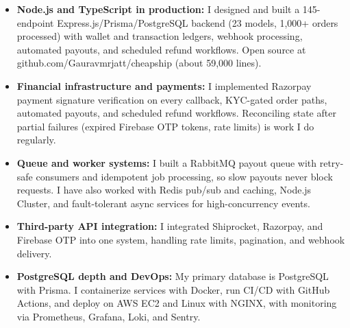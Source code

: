 \documentclass[]{cover}
\begin{document}

\currentdate{\today}



{\raggedright{}\fontsize{11pt}{13pt}\selectfont
\renewcommand{\labelitemi}{\textbullet}
\renewcommand{\labelitemii}{\textbullet}
\renewcommand{\labelitemiii}{\textbullet}
\begin{itemize}
    \item \textbf{Node.js and TypeScript in production:} I designed and built a 145-endpoint Express.js/Prisma/PostgreSQL backend (23 models, 1,000+ orders processed) with wallet and transaction ledgers, webhook processing, automated payouts, and scheduled refund workflows. Open source at github.com/Gauravmrjatt/cheapship (about 59,000 lines).
    \item \textbf{Financial infrastructure and payments:} I implemented Razorpay payment signature verification on every callback, KYC-gated order paths, automated payouts, and scheduled refund workflows. Reconciling state after partial failures (expired Firebase OTP tokens, rate limits) is work I do regularly.
    \item \textbf{Queue and worker systems:} I built a RabbitMQ payout queue with retry-safe consumers and idempotent job processing, so slow payouts never block requests. I have also worked with Redis pub/sub and caching, Node.js Cluster, and fault-tolerant async services for high-concurrency events.
    \item \textbf{Third-party API integration:} I integrated Shiprocket, Razorpay, and Firebase OTP into one system, handling rate limits, pagination, and webhook delivery.
    \item \textbf{PostgreSQL depth and DevOps:} My primary database is PostgreSQL with Prisma. I containerize services with Docker, run CI/CD with GitHub Actions, and deploy on AWS EC2 and Linux with NGINX, with monitoring via Prometheus, Grafana, Loki, and Sentry.
\end{itemize}\par}
\vspace{6pt}
\end{document}

